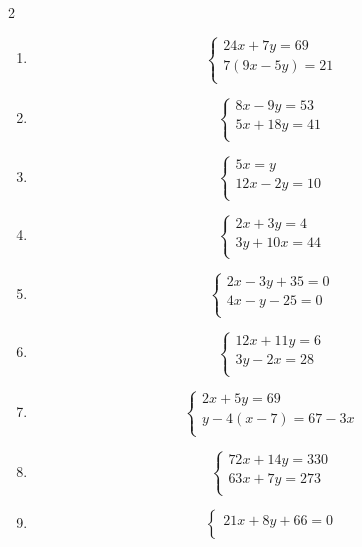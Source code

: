 \begin{exercice}
\begin{multicols}{2}
\begin{enumerate}
$$\begin{array} {l}
   15y+2x=19 \\ 
\end{array} \right.$$ 
\item $$\left\{ \begin{array} {l}
    24x+7y=69 \\ 
   7(9x-5y)=21 \\ 
\end{array} \right.$$ 
\item $$\left\{ \begin{array} {l}
    8x-9y=53 \\ 
   5x+18y=41 \\ 
\end{array} \right.$$ 
\item $$\left\{ \begin{array} {l}
    5x=y \\ 
   12x-2y=10 \\ 
\end{array} \right.$$
\item $$\left\{ \begin{array} {l}
    2x+3y=4 \\ 
   3y+10x=44 \\ 
\end{array} \right.$$
\item $$\left\{ \begin{array} {l}
    2x-3y+35=0 \\ 
   4x-y-25=0 \\ 
\end{array} \right.$$
\item $$\left\{ \begin{array} {l}
    12x+11y=6 \\ 
   3y-2x=28 \\ 
\end{array} \right.$$
\item $$\left\{ \begin{array} {l}
    2x+5y=69 \\ 
   y-4(x-7)=67-3x \\ 
\end{array} \right.$$
\item $$\left\{ \begin{array} {l}
    72x+14y=330 \\ 
   63x+7y=273 \\ 
\end{array} \right.$$
\item $$\left\{ \begin{array} {l}
    21x+8y+66=0 \\ 

\end{array}$$
\end{enumerate}
\end{multicols}
\end{exercice}
